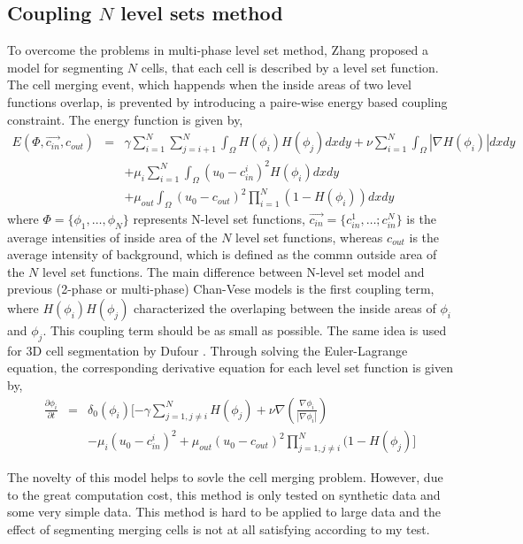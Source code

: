 \subsection{Coupling $N$ level sets method}
To overcome the problems in multi-phase level set method, Zhang \cite{zhang2004tracking} proposed a model for segmenting $N$ cells, that each cell is described by a level set function. The cell merging event, which happends when the inside areas of two level functions overlap, is prevented by introducing a paire-wise energy based coupling constraint. The energy function is given by,
\begin{eqnarray}
\nonumber
E(\Phi, \vec{c_{in}}, c_{out}) & = & \gamma \sum_{i=1}^N\sum_{j=i+1}^N\int_\Omega H(\phi_i)H(\phi_j)dxdy + \nu \sum_{i=1}^N\int_\Omega |\nabla H(\phi_i)|dxdy\\
& & + \mu_i\sum_{i=1}^N\int_\Omega (u_0 - c_{in}^i)^2H(\phi_i)dxdy \\
\nonumber
& & + \mu_{out}\int_\Omega(u_0 - c_{out})^2 \prod_{i=1}^N(1-H(\phi_i))dxdy
\end{eqnarray}
where $\Phi = \{\phi_1,\ldots,\phi_N\}$ represents N-level set functions, $\vec{c_{in}} = \{c_{in}^1, \ldots; c_{in}^N\}$ is the average intensities of inside area of the $N$ level set functions, whereas $c_{out}$ is the average intensity of background, which is defined as the commn outside area of the $N$ level set functions. The main difference between N-level set model and previous (2-phase or multi-phase) Chan-Vese models is the first coupling term, where $H(\phi_i)H(\phi_j)$ characterized the overlaping between the inside areas of $\phi_i$ and $\phi_j$. This coupling term should be as small as possible. The same idea is used for 3D cell segmentation by Dufour \cite{dufour2005segmenting}. Through solving the Euler-Lagrange equation, the corresponding derivative equation for each level set function is given by,
\begin{eqnarray}
\frac{\partial \phi_i}{\partial t} & = & \delta_0(\phi_i)[-\gamma\sum_{j=1, j\ne i}^NH(\phi_j) + \nu\nabla(\frac{\nabla\phi_i}{|\nabla\phi_i|}) \\
& & - \mu_i(u_0 - c_{in}^i)^2 + \mu_{out}(u_0 - c_{out})^2\prod_{j=1, j\ne i}^N(1-H(\phi_j)]
\end{eqnarray}

The novelty of this model helps to sovle the cell merging problem. However, due to the great computation cost, this method is only tested on synthetic data and some very simple data. This method is hard to be applied to large data and the effect of segmenting merging cells is not at all satisfying according to my test.

